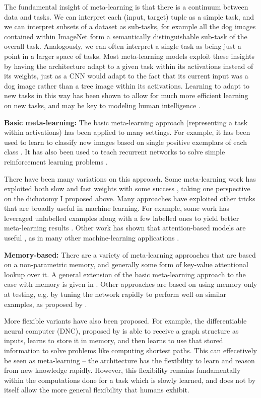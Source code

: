 The fundamental insight of meta-learning is that there is a continuum between data and tasks. We can interpret each (input, target) tuple as a simple task, and we can interpret subsets of a dataset as sub-tasks, for example all the dog images contained within ImageNet form a semantically distinguishable sub-task of the overall task. Analogously, we can often interpret a single task as being just a point in a larger space of tasks. Most meta-learning models exploit these insights by having the architecture adapt to a given task within its activations instead of its weights, just as a CNN would adapt to the fact that its current input was a dog image rather than a tree image within its activations. Learning to adapt to new tasks in this way has been shown to allow for much more efficient learning on new tasks, and may be key to modeling human intelligence \citep{Hansen2017}. \par 
\textbf{Basic meta-learning:}
The basic meta-learning approach (representing a task within activations) has been applied to many settings. For example, it has been used to learn to classify new images based on single positive exemplars of each class \citep{Vinyals2016}. It has also been used to teach recurrent networks to solve simple reinforcement learning problems \citep{Duan2016, Wang2016a, Stadie2018}. \par
There have been many variations on this approach. Some meta-learning work has exploited both slow and fast weights with some success \citep[e.g.][]{Munkhdalai2017}, taking one perspective on the dichotomy I proposed above. Many approaches have exploited other tricks that are broadly useful in machine learning. For example, some work has leveraged unlabelled examples along with a few labelled ones to yield better meta-learning results \citep[e.g.][]{Ren2018}. Other work has shown that attention-based models are useful \citep{Reed2017}, as in many other machine-learning applications \citep[e.g.][]{Vaswani, Gregor2015}. \par
\textbf{Memory-based:} There are a variety of meta-learning approaches that are based on a non-parametric memory, and generally some form of key-value attentional lookup over it. A general extension of the basic meta-learning approach to the case with memory is given in \citet{Santoro2016}. Other approaches are based on using memory only at testing, e.g. by tuning the network rapidly to perform well on similar examples, as proposed by \citet{Sprechmann2018}. \par 
More flexible variants have also been proposed. For example, the differentiable neural computer (DNC), proposed by \citet{Graves2016} is able to receive a graph structure as inputs, learns to store it in memory, and then learns to use that stored information to solve problems like computing shortest paths. This can effecetively be seen as meta-learning -- the architecture has the flexibility to learn and reason from new knowledge rapidly. However, this flexibility remains fundamentally within the computations done for a task which is slowly learned, and does not by itself allow the more general flexibility that humans exhibit. \par
